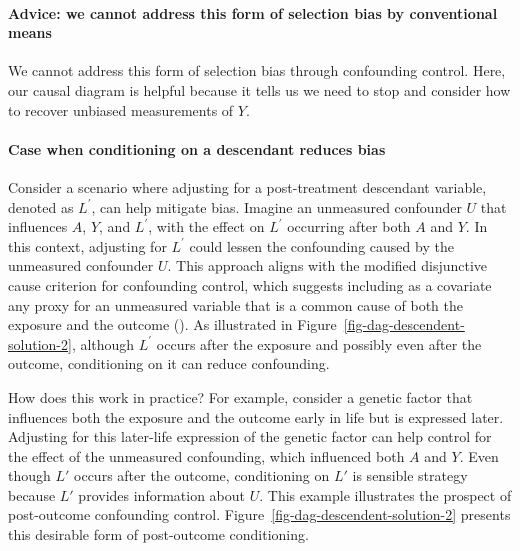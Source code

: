 \documentclass[
  singlecolumn,
  9pt]{article}
\let\oldparagraph\paragraph
\renewcommand{\paragraph}[1]{\oldparagraph{#1}\mbox{}}
\begin{document}
\paragraph{Advice: we cannot address this form of selection bias by
conventional
means}\label{advice-we-cannot-address-this-form-of-selection-bias-by-conventional-means}

We cannot address this form of selection bias through confounding
control. Here, our causal diagram is helpful because it tells us we need
to stop and consider how to recover unbiased measurements of \(Y\).

\paragraph{Case when conditioning on a descendant reduces
bias}\label{case-when-conditioning-on-a-descendant-reduces-bias}

Consider a scenario where adjusting for a post-treatment descendant
variable, denoted as \(L^\prime\), can help mitigate bias. Imagine an
unmeasured confounder \(U\) that influences \(A\), \(Y\), and
\(L^\prime\), with the effect on \(L^\prime\) occurring after both \(A\)
and \(Y\). In this context, adjusting for \(L^\prime\) could lessen the
confounding caused by the unmeasured confounder \(U\). This approach
aligns with the modified disjunctive cause criterion for confounding
control, which suggests including as a covariate any proxy for an
unmeasured variable that is a common cause of both the exposure and the
outcome (). As
illustrated in Figure~\ref{fig-dag-descendent-solution-2}, although
\(L^\prime\) occurs after the exposure and possibly even after the
outcome, conditioning on it can reduce confounding.

How does this work in practice? For example, consider a genetic factor
that influences both the exposure and the outcome early in life but is
expressed later. Adjusting for this later-life expression of the genetic
factor can help control for the effect of the unmeasured confounding,
which influenced both \(A\) and \(Y\). Even though \(L'\) occurs after
the outcome, conditioning on \(L'\) is sensible strategy because \(L'\)
provides information about \(U\). This example illustrates the prospect
of post-outcome confounding control.
Figure~\ref{fig-dag-descendent-solution-2} presents this desirable form
of post-outcome conditioning.
\end{document}
